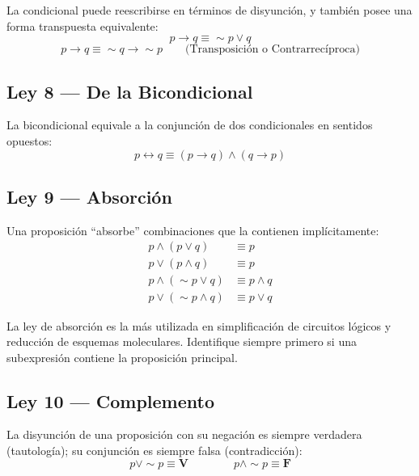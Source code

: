 \begin{cajaprop}[7 — De la Condicional]
  La condicional puede reescribirse en términos de disyunción, y también
  posee una forma transpuesta equivalente:
  \[
    p \rightarrow q \equiv \sim p \vee q
  \]
  \[
    p \rightarrow q \equiv \sim q \rightarrow \sim p \qquad
    \text{(Transposici\'{o}n o Contrarrecíproca)}
  \]
\end{cajaprop}

\subsection{Ley 8 — De la Bicondicional}

\begin{cajaprop}[8 — De la Bicondicional]
  La bicondicional equivale a la conjunción de dos condicionales en
  sentidos opuestos:
  \[
    p \leftrightarrow q \equiv (p \rightarrow q) \wedge (q \rightarrow p)
  \]
\end{cajaprop}

\subsection{Ley 9 — Absorción}

\begin{cajaprop}[9 — Absorci\'{o}n]
  Una proposición ``absorbe'' combinaciones que la contienen implícitamente:
  \begin{align*}
    p \wedge (p \vee q) &\equiv p \\[4pt]
    p \vee (p \wedge q) &\equiv p \\[4pt]
    p \wedge (\sim p \vee q) &\equiv p \wedge q \\[4pt]
    p \vee (\sim p \wedge q) &\equiv p \vee q
  \end{align*}
\end{cajaprop}

\begin{cajatip}
  La ley de absorción es la más utilizada en simplificación de circuitos
  lógicos y reducción de esquemas moleculares. Identifique siempre primero
  si una subexpresión contiene la proposición principal.
\end{cajatip}

\subsection{Ley 10 — Complemento}

\begin{cajaprop}[10 — Complemento]
  La disyunción de una proposición con su negación es siempre verdadera
  (tautología); su conjunción es siempre falsa (contradicción):
  \[
    p \vee \sim p \equiv \mathbf{V} \qquad\qquad p \wedge \sim p \equiv \mathbf{F}
  \]
\end{cajaprop}

